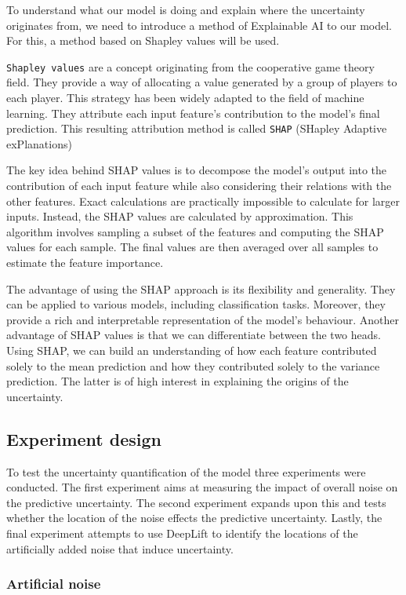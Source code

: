 To understand what our model is doing and explain where the uncertainty originates from, we need to introduce a method of Explainable AI to our model. For this, a method based on Shapley values will be used.

\verb|Shapley values| are a concept originating from the cooperative game theory field. They provide a way of allocating a value generated by a group of players to each player. This strategy has been widely adapted to the field of machine learning. They attribute each input feature's contribution to the model's final prediction. This resulting attribution method is called \verb|SHAP| (SHapley Adaptive exPlanations)

The key idea behind SHAP values is to decompose the model's output into the contribution of each input feature while also considering their relations with the other features. Exact calculations are practically impossible to calculate for larger inputs. Instead, the SHAP values are calculated by approximation. This algorithm involves sampling a subset of the features and computing the SHAP values for each sample. The final values are then averaged over all samples to estimate the feature importance.

The advantage of using the SHAP approach is its flexibility and generality. They can be applied to various models, including classification tasks. Moreover, they provide a rich and interpretable representation of the model's behaviour. Another advantage of SHAP values is that we can differentiate between the two heads. Using SHAP, we can build an understanding of how each feature contributed solely to the mean prediction and how they contributed solely to the variance prediction. The latter is of high interest in explaining the origins of the uncertainty. 

\subsection{Experiment design}

To test the uncertainty quantification of the model three experiments were conducted. The first experiment aims at measuring the impact of overall noise on the predictive uncertainty. The second experiment expands upon this and tests whether the location of the noise effects the predictive uncertainty. Lastly, the final experiment attempts to use DeepLift to identify the locations of the artificially added noise that induce uncertainty.

\subsubsection{Artificial noise}

